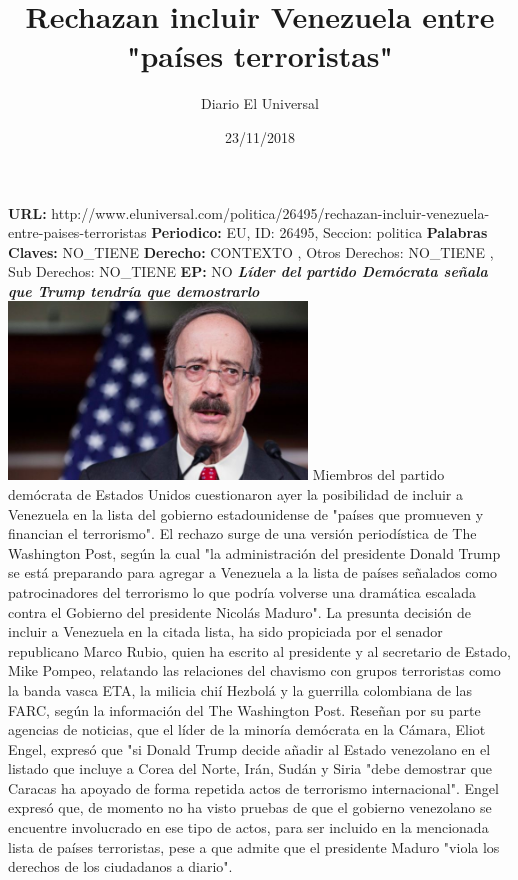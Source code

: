 \documentclass{article}%
\title{\textbf{Rechazan incluir Venezuela entre "países terroristas"}}%
\author{Diario El Universal}%
\date{23/11/2018}%
\begin{document}
%
\normalsize%
\maketitle%
\textbf{URL: }%
http://www.eluniversal.com/politica/26495/rechazan{-}incluir{-}venezuela{-}entre{-}paises{-}terroristas\newline%
%
\textbf{Periodico: }%
EU, %
ID: %
26495, %
Seccion: %
politica\newline%
%
\textbf{Palabras Claves: }%
NO\_TIENE\newline%
%
\textbf{Derecho: }%
CONTEXTO%
, Otros Derechos: %
NO\_TIENE%
, Sub Derechos: %
NO\_TIENE%
\newline%
%
\textbf{EP: }%
NO\newline%
\newline%
%
\textbf{\textit{Líder del partido Demócrata señala que Trump tendría que demostrarlo}}%
\newline%
\newline%
%
\includegraphics[width=300px]{126.JPG}%
\newline%
%
Miembros del partido demócrata de Estados Unidos cuestionaron ayer la posibilidad de incluir a  Venezuela en la lista del gobierno estadounidense de "países que promueven y  financian el terrorismo".%
\newline%
%
El rechazo surge de una versión periodística de The Washington Post, según la cual "la administración del presidente Donald Trump se está preparando para agregar a Venezuela a la lista de países señalados como patrocinadores del terrorismo lo que podría volverse una dramática escalada contra el Gobierno del presidente Nicolás Maduro".%
\newline%
%
La presunta decisión de incluir a Venezuela en la citada lista, ha sido propiciada por el senador republicano Marco Rubio, quien ha escrito al presidente y al secretario de Estado, Mike Pompeo, relatando las relaciones del chavismo con grupos terroristas como la banda vasca ETA, la milicia chií Hezbolá y la guerrilla colombiana de las FARC, según la información del The Washington Post.%
\newline%
%
Reseñan por su parte agencias de noticias, que el líder de la minoría demócrata en la Cámara, Eliot Engel, expresó que "si Donald Trump decide añadir al Estado venezolano en el listado que incluye a Corea del Norte, Irán, Sudán y Siria "debe demostrar que Caracas ha apoyado de forma repetida actos de terrorismo internacional".%
\newline%
%
Engel expresó que, de momento no ha visto pruebas de que el gobierno venezolano se encuentre involucrado en ese tipo de actos, para ser incluido en la mencionada lista de países terroristas, pese a que admite que el presidente Maduro "viola los derechos de los ciudadanos  a diario".%
\newline%
%
\end{document}
